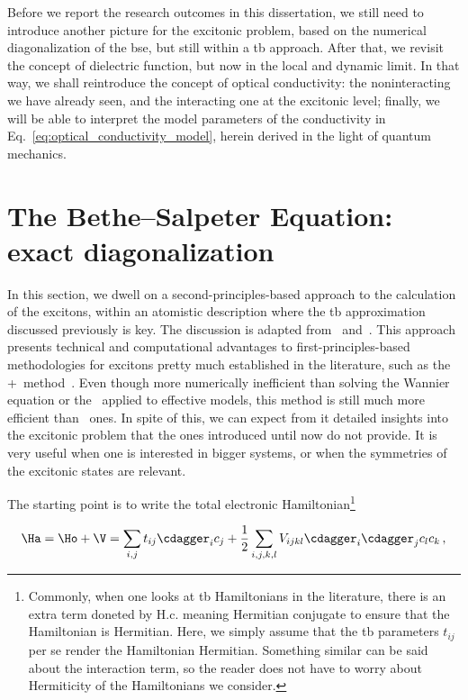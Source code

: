 Before we report the research outcomes in this dissertation, we still need to introduce another picture for the excitonic problem, based on the numerical diagonalization of the \gls{bse}, but still within a \gls{tb} approach.
After that, we revisit the concept of dielectric function, but now in the local and dynamic limit.
In that way, we shall reintroduce the concept of optical conductivity: the noninteracting we have already seen, and the interacting one at the excitonic level; finally, we will be able to interpret the model parameters of the conductivity in Eq.~\eqref{eq:optical_conductivity_model}, herein derived in the light of quantum mechanics.

\section{The Bethe--Salpeter Equation: exact diagonalization}
\label{sec:bethe_salpeter_equation_exact}

In this section, we dwell on a second-principles-based approach to the calculation of the excitons, within an atomistic description where the \gls{tb} approximation discussed previously is key.
The discussion is adapted from~\cite{Alex_PhD} and~\cite{Xatu}.
This approach presents technical and computational advantages to first-principles-based methodologies for excitons pretty much established in the literature, such as the \GW+\bse~method~\cite{Louie_2000,BerkeleyGW,Diana_PhD,Jornada_PhD}.
Even though more numerically inefficient than solving the Wannier equation or the \bse~applied to effective models, this method is still much more efficient than \abinit~ones.
In spite of this, we can expect from it detailed insights into the excitonic problem that the ones introduced until now do not provide.
It is very useful when one is interested in bigger systems, or when the symmetries of the excitonic states are relevant.

The starting point is to write the total electronic Hamiltonian\footnote{Commonly, when one looks at \gls{tb} Hamiltonians in the literature, there is an extra term doneted by $\mathrm{H.c.}$ meaning Hermitian conjugate to ensure that the Hamiltonian is Hermitian. Here, we simply assume that the \gls{tb} parameters $t_{ij}$ per se render the Hamiltonian Hermitian. Something similar can be said about the interaction term, so the reader does not have to worry about Hermiticity of the Hamiltonians we consider.}

\begin{equation}
    \label{eq:Hamiltonian_start}
    \Ha = \Ho + \V = \sum_{i,j} t_{i j} \cdagger_i c_j + \frac{1}{2} \sum_{i,j,k,l} V_{ijkl} \cdagger_i \cdagger_j c_l c_k\,,
\end{equation}


